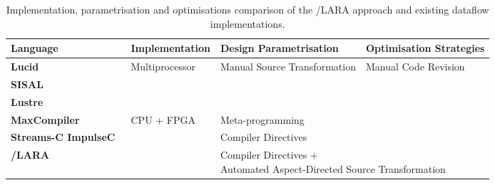 \begin{table}[!ht]
  \renewcommand{\arraystretch}{1.5}
  \centering
  \begin{tabularx}{\textwidth}{ m{2.5cm} | X | X | p{2.5cm}}
    \hline
    \bf{Language}                  & \bf{Implementation}             & \bf{Design Parametrisation}                     & \bf{Optimisation Strategies}                                                                                                                                        \\
    \hline \hline
    \bf{Lucid}                     & \multirow{3}{*}{Multiprocessor} & \multirow{3}{3cm}{Manual Source Transformation} & \multirow{5}{3cm}{Manual Code Revision}                                                                                                                             \\
   \bf{SISAL}                      &                                 &                                                 &                                                                                                                                                                     \\
 \bf{Lustre}                      &                             &                              &                                                                            \\
    \bf{MaxCompiler}             & \multirow{6}{*}{CPU + FPGA} & Meta-programming             &                                                                            \\
\cline{1-1}\cline{2-3}
  \bf{Streams-C} \bf{ImpulseC}\ &                             & Compiler \newline Directives &                                                                            \\
\hline
  \bf{\FAST{}}/\bf{LARA}         &                             & \multicolumn{2}{p{7cm}}{Compiler Directives + \newline Automated Aspect-Directed Source Transformation} \\
  \end{tabularx}
  \caption{Implementation, parametrisation and optimisations comparison of the \FAST{}/LARA approach and existing dataflow implementations.}
  \label{table:feature-comparison2}
\end{table}
